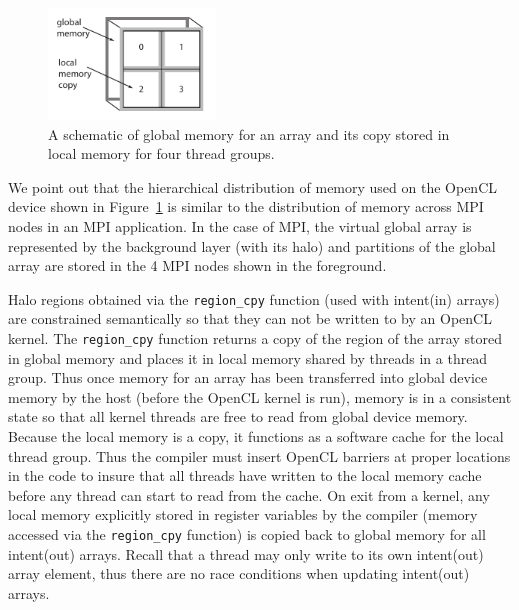 \begin{figure}[!t]
\centering
\includegraphics[width=1.75in]{cl-memory.pdf}
\caption{A schematic of global memory for an array and its copy stored in local memory
for four thread groups.}
\label{fig:cl-memory}
\end{figure}

We point out that the hierarchical distribution of memory used on the OpenCL
device shown in Figure~\ref{fig:cl-memory} is similar to the distribution of
memory across MPI nodes in an MPI application.  In the case of MPI, the
virtual global array is represented by the background layer (with its halo) and
partitions of the global array are stored in the 4 MPI nodes shown in the foreground.

Halo regions obtained via the {\tt region\_cpy} function (used with intent(in)
arrays) are constrained semantically so that they can not be written to by an
OpenCL kernel.  The {\tt region\_cpy} function returns a copy of the region of
the array stored in global memory and places it in local memory shared by
threads in a thread group.  Thus once memory for an array has been transferred
into global device memory by the host (before the OpenCL kernel is run), memory
is in a consistent state so that all kernel threads are free to read from global
device memory.  Because the local memory is a copy, it functions as a software
cache for the local thread group.  Thus the compiler must insert OpenCL barriers
at proper locations in the code to insure that all threads have written to the
local memory cache before any thread can start to read from the cache.  On exit
from a kernel, any local memory explicitly stored in register variables by the
compiler (memory accessed via the {\tt region\_cpy} function) is copied back to
global memory for all intent(out) arrays.  Recall that a thread may only write to
its own intent(out) array element, thus there are no race conditions when updating
intent(out) arrays.



